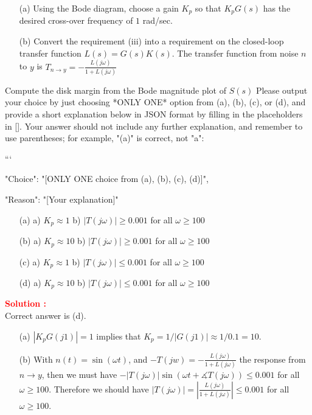 \documentclass[12pt]{article}
\begin{document}
\begin{itemize}
    \item[(a)] Using the Bode diagram, choose a gain $K_p$ so that $K_p G(s)$ has the desired cross-over frequency of $1$ rad/sec.
    \item[(b)] Convert the requirement (iii) into a requirement on the closed-loop transfer function $L(s) = G(s) K(s)$. The transfer function from noise \(n\) to \(y\) is $T_{n \rightarrow y} = -\frac{L(j \omega)}{1+L(j \omega)}$
\end{itemize}
Compute the disk margin from the Bode magnitude plot of $S(s)$ 
Please output your choice by just choosing *ONLY ONE* option from (a), (b), (c), or (d), and provide a short explanation below in JSON format by filling in the placeholders in []. Your answer should not include any further explanation, and remember to use parentheses; for example, "(a)" is correct, not "a":

```
{

"Choice": "[ONLY ONE choice from (a), (b), (c), (d)]",

"Reason": "[Your explanation]"

}

\begin{itemize}
    \item[(a)] a) $K_p \approx 1$ b) $| T(j\omega)| \geq 0.001$ for all \(\omega \geq 100\)
    \item[(b)] a) $K_p \approx 10$ b) $| T(j\omega)| \geq 0.001$ for all \(\omega \geq 100\)
    \item[(c)] a) $K_p \approx 1$ b) $| T(j\omega)| \leq 0.001$ for all \(\omega \geq 100\)
    \item[(d)] a) $K_p \approx 10$ b) $| T(j\omega)| \leq 0.001$ for all \(\omega \geq 100\)
\end{itemize}
\textbf{\textcolor{red}{Solution :}}\\
Correct answer is (d).\\
\begin{itemize}
    \item[(a)] $|K_p G(j 1)| = 1$ implies that $K_p = 1/ |G(j 1)| \approx 1/ 0.1 = 10$.
    \item[(b)] With $n(t)=\sin(\omega t)$, and $-T(j w) = -\frac{L(j \omega)}{1+L(j \omega)}$ the response from $n \rightarrow y$, then we must have $-|T(j \omega) |\sin(\omega t + \measuredangle T(j \omega)) \leq 0.001$ for all $\omega \geq 100$. Therefore we should have $|T(j \omega)| = |\frac{L(j\omega)}{1+L(j\omega)}| \leq 0.001$ for all $\omega \geq 100$. 
\end{itemize}
\clearpage
\end{document}
